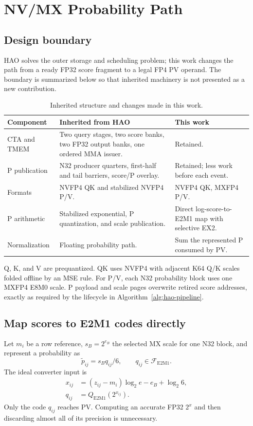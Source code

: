 \section{NV/MX Probability Path}

\subsection{Design boundary}

HAO solves the outer storage and scheduling problem; this work changes the
path from a ready FP32 score fragment to a legal FP4 PV operand. The boundary
is summarized below so that inherited machinery is not presented as a new
contribution.

\begin{table}[htbp]
\centering
\caption{Inherited structure and changes made in this work.}
\label{tab:hao-vs-ours}
\small
\begin{tabularx}{\textwidth}{p{}X X}
\toprule
Component & Inherited from HAO & This work \\
\midrule
CTA and TMEM & Two query stages, two score banks, two FP32 output banks, one ordered MMA issuer. & Retained. \\
P publication & N32 producer quarters, first-half and tail barriers, score/P overlay. & Retained; less work before each event. \\
Formats & NVFP4 QK and stabilized NVFP4 P/V. & NVFP4 QK, MXFP4 P/V. \\
P arithmetic & Stabilized exponential, P quantization, and scale publication. & Direct log-score-to-E2M1 map with selective EX2. \\
Normalization & Floating probability path. & Sum the represented P consumed by PV. \\
\bottomrule
\end{tabularx}
\end{table}

Q, K, and V are prequantized. QK uses NVFP4 with adjacent K64 Q/K scales
folded offline by an MSE rule. For P/V, each N32 probability block uses one
MXFP4 E8M0 scale. P payload and scale pages overwrite retired score addresses,
exactly as required by the lifecycle in Algorithm~\ref{alg:hao-pipeline}.

\subsection{Map scores to E2M1 codes directly}

Let $m_i$ be a row reference, $s_B=2^{e_B}$ the selected MX scale for one
N32 block, and represent a probability as
\begin{equation}
  \widetilde p_{ij}=s_B q_{ij}/6,
  \qquad q_{ij}\in\mathcal F_{\mathrm{E2M1}}.
  \label{eq:represented-probability}
\end{equation}
The ideal converter input is
\begin{align}
  x_{ij} &= (z_{ij}-m_i)\log_2 e-e_B+\log_2 6, \\
  q_{ij} &= Q_{\mathrm{E2M1}}(2^{x_{ij}}).
  \label{eq:ideal-code-path}
\end{align}
Only the code $q_{ij}$ reaches PV. Computing an accurate FP32 $2^x$ and then
discarding almost all of its precision is unnecessary.

